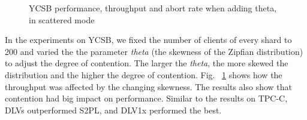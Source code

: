 \documentclass[conference]{IEEEtran}
\begin{document}
\begin{figure}[htbp]
  \centering

\caption{YCSB performance, throughput and abort rate when adding theta, in scattered mode}
\label{fig:plot_ycsb_add_Theta_Theta_TPM_gather}
\end{figure}

In the experiments on YCSB, we fixed the number of clients of every shard to 200 and varied the the parameter \emph{theta} (the skewness of the Zipfian distribution) to adjust the degree of contention.
The larger the \emph{theta}, the more skewed the distribution and the higher the degree of contention. 
Fig. ~\ref{fig:plot_ycsb_add_Theta_Theta_TPM_gather} shows how the throughput was affected by the changing skewness.
The results also show that contention had big impact on performance.
Similar to the results on TPC-C, DLVs outperformed S2PL, and DLV1x performed the best.
\end{document}
